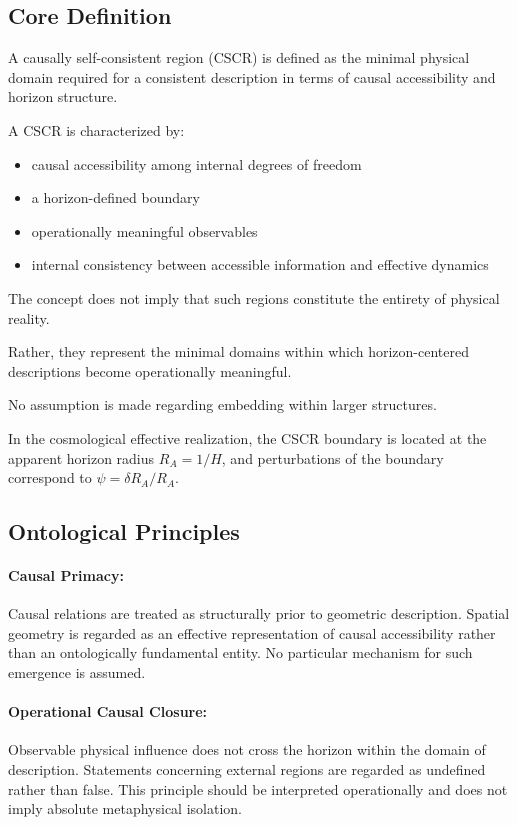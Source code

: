 \documentclass[12pt,a4paper]{article}
\begin{document}
\subsection{Core Definition}

A causally self-consistent region (CSCR) is defined as the minimal physical domain required for a consistent description in terms of causal accessibility and horizon structure.

A CSCR is characterized by:

\begin{itemize}
  \item causal accessibility among internal degrees of freedom
  \item a horizon-defined boundary
  \item operationally meaningful observables
  \item internal consistency between accessible information and effective dynamics
\end{itemize}

The concept does not imply that such regions constitute the entirety of physical reality.

Rather, they represent the minimal domains within which horizon-centered descriptions become operationally meaningful.

No assumption is made regarding embedding within larger structures.

In the cosmological effective realization, the CSCR boundary is located at the apparent horizon radius $R_A = 1/H$, and perturbations of the boundary correspond to $\psi = \delta R_A / R_A$.

\subsection{Ontological Principles}

\paragraph{Causal Primacy:} Causal relations are treated as structurally prior to geometric description. Spatial geometry is regarded as an effective representation of causal accessibility rather than an ontologically fundamental entity. No particular mechanism for such emergence is assumed.

\paragraph{Operational Causal Closure:} Observable physical influence does not cross the horizon within the domain of description. Statements concerning external regions are regarded as undefined rather than false. This principle should be interpreted operationally and does not imply absolute metaphysical isolation.
\end{document}

